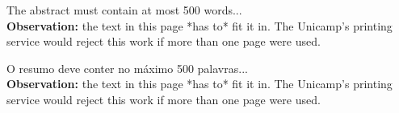 \documentclass[%
        TwoSidePages,%
        English,%
        FinalVersion,%
        Copyright,%
        TablesPage,%
        FiguresPage,%
        ]%
{ic-tese-v2}
\begin{document}





        \beforepreface

        \begin{theabstract}
        The abstract must contain at most 500 words...\\

\textbf{Observation:} the text in this page *has to* fit it in. The Unicamp's printing service would reject this work
if more than one page were used.
        \end{theabstract}

%
        \begin{oresumo}
        O resumo deve conter no m{\'a}ximo 500 palavras...\\

\textbf{Observation:} the text in this page *has to* fit it in. The Unicamp's printing service would reject this work
if more than one page were used.
        \end{oresumo}
\end{document}
